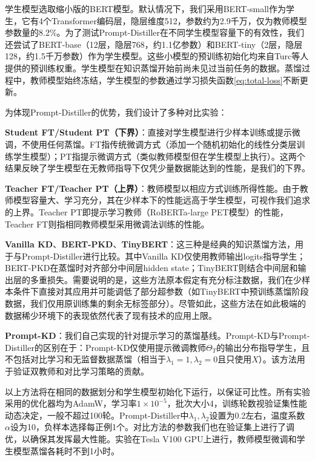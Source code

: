 \documentclass[../main.tex]{subfiles}
\begin{document}
学生模型选取缩小版的BERT模型。默认情况下，我们采用BERT-small作为学生，它有4个Transformer编码层，隐层维度512，参数约为2.9千万，仅为教师模型参数量的8.2\%。为了测试Prompt-Distiller在不同学生模型容量下的有效性，我们还尝试了BERT-base（12层，隐层768，约1.1亿参数）和BERT-tiny（2层，隐层128，约1.5千万参数）作为学生模型。这些小模型的预训练初始化均来自Turc等人提供的预训练权重\cite{wellreadstudents_turc_2019}。学生模型在知识蒸馏开始前尚未见过当前任务的数据。蒸馏过程中，教师模型始终冻结，学生模型的参数通过学习损失函数\eqref{eq:total-loss}不断更新。


为体现Prompt-Distiller的优势，我们设计了多种对比实验：

\textbf{Student FT/Student PT（下界）}：直接对学生模型进行少样本训练或提示微调，不使用任何蒸馏。FT指传统微调方式（添加一个随机初始化的线性分类层训练学生模型）；PT指提示微调方式（类似教师模型但在学生模型上执行）。这两个结果反映了学生模型在无教师指导下仅凭少量数据能达到的性能，是我们的下界。

\textbf{Teacher FT/Teacher PT（上界）}：教师模型以相应方式训练所得性能。由于教师模型容量大、学习充分，其在少样本下的性能远高于学生模型，可视作我们追求的上界。Teacher PT即提示学习教师（RoBERTa-large PET模型）的性能，Teacher FT则指相同教师模型采用微调法训练的性能。

\textbf{Vanilla KD}、\textbf{BERT-PKD}、\textbf{TinyBERT}：这三种是经典的知识蒸馏方法，用于与Prompt-Distiller进行比较\cite{distillingknowledgeneural_hinton_2015,patientknowledgedistillation_sun_2019,tinybertdistillingbert_jiao_2020}。其中Vanilla KD仅使用教师输出logits指导学生；BERT-PKD在蒸馏时对齐部分中间层hidden state；TinyBERT则结合中间层和输出层的多重损失。需要说明的是，这些方法原本假定有充分标注数据，我们在少样本条件下直接对其应用并可能调低了部分超参数（如TinyBERT中预训练蒸馏阶段数据，我们仅用原训练集的剩余无标签部分）。尽管如此，这些方法在如此极端的数据稀少环境下的表现依然代表了现有技术的应用上限。

\textbf{Prompt-KD}：我们自己实现的针对提示学习的蒸馏基线。Prompt-KD与Prompt-Distiller的区别在于：Prompt-KD仅使用提示微调教师$\Theta_T$的输出分布指导学生，且不包括对比学习和无监督数据蒸馏（相当于$\lambda_1=1,\lambda_2=0$且只使用$X$）。该方法用于验证双教师和对比学习策略的贡献。

以上方法将在相同的数据划分和学生模型初始化下运行，以保证可比性。所有实验采用的优化器均为AdamW，学习率$1\times 10^{-5}$，批次大小4，训练轮数视验证集性能动态决定，一般不超过100轮。Prompt-Distiller中$\lambda_1,\lambda_2$设置为0.2左右，温度系数$\alpha$设为10，负样本选择每正例1个。对比方法的参数我们也在验证集上进行了调优，以确保其发挥最大性能。实验在Tesla V100 GPU上进行，教师模型微调和学生模型蒸馏各耗时不到1小时。
\end{document}

